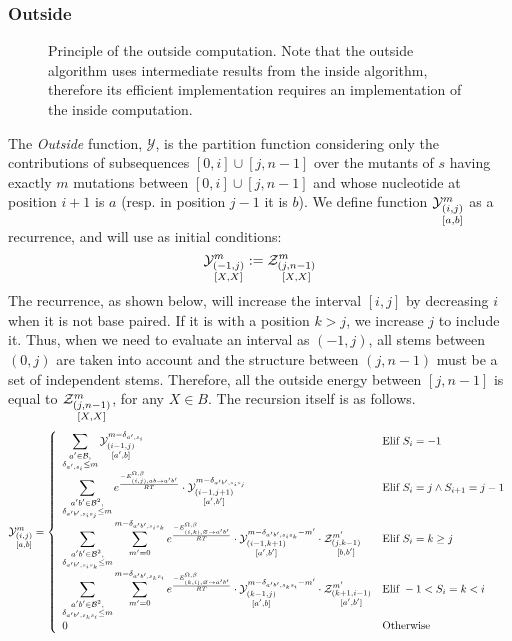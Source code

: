 \subsubsection{Outside}	
\begin{figure}
\resizebox{\textwidth}{!}{}
\caption{Principle of the outside computation. Note that the outside algorithm uses intermediate results from the inside algorithm, 
therefore its efficient implementation requires an implementation of the inside computation.}
\end{figure}
The \emph{Outside} function, $\mathcal Y$, is the partition function considering only the 
contributions of subsequences $[0,i]\cup[j,n-1]$ over the mutants of $s$ having exactly $m$ mutations between $[0,i]\cup[j,n-1]$ and whose nucleotide at position $i+1$ is $a$ 
(resp. in position $j-1$ it is $b$).
We define function $\Y{i,j}{m}{a,b}$ as a recurrence, and will use as initial conditions:
\begin{equation}
	\Y{-1,j}{m}{X,X}:=
		\displaystyle
	  \Z{j,n-1}{m}{X,X}
\label{eq:Y_in}
\end{equation}
The recurrence, as shown below, will increase the interval $[i,j]$ by decreasing $i$ when
it is not base paired. If it is with a position $k>j$, we increase $j$ to include it.
 Thus, when we need
to evaluate an interval as $(-1,j)$, all stems between $(0,j)$ are taken into account and the
structure between $(j,n-1)$ must be a set of independent stems. Therefore,
 all the outside energy between $[j,n-1]$ is
equal to $\Z{j,n-1}{m}{X,X}$, for any $X\in B$. The recursion itself is as follows.
\begin{equation}
	\Y{i,j}{m}{a,b} = \left\{
  \begin{array}{ll}
		\displaystyle
    \sum_{\substack{a'\in \B,\\ \Kron_{a',s_i}\le m}}
    \Y{i-1,j}{m- \Kron_{a',s_i}}{a',b} &
    \text{Elif }S_i=-1 \\
    \displaystyle
    \sum_{\substack{a'b'\in \B^2,\\ \Kron_{a'b',s_is_j}\le m}}
		 e^{\frac{-E_{(i,j),ab \to a'b'}^{\Omega,\beta}}{RT}}\cdot
    \Y{i-1,j+1}{m- \Kron_{a'b',s_is_j}}{a',b'} &
   	 \text{Elif }S_{i}=j \land S_{i+1}=j-1\\
		 \displaystyle
		 \sum_{\substack{a'b'\in \B^2,\\ \Kron_{a'b',s_is_k}\le m}}
		 \sum_{m'=0}^{m-\Kron_{a'b',s_is_k}}
  		 e^{\frac{-E_{(i,k),\varnothing\to a'b'}^{\Omega,\beta}}{RT}}
		 \cdot\Y{i-1,k+1}{m- \Kron_{a'b',s_is_k} - m'}{a',b'}
     \cdot\Z{j,k-1}{m'}{b,b'} &
		 \text{Elif }S_{i}=k \geq j\\
		 \displaystyle
		 \sum_{\substack{a'b'\in \B^2,\\ \Kron_{a'b',s_ks_i}\le m}}
		 \sum_{m'=0}^{m-\Kron_{a'b',s_ks_i}}
   	 e^{\frac{-E_{(k,i),\varnothing\to a'b'}^{\Omega,\beta}}{RT}}
		 \cdot\Y{k-1,j}{m- \Kron_{a'b',s_ks_i} - m'}{a',b}
     \cdot\Z{k+1,i-1}{m'}{a',b'} &
		 \text{Elif }-1 < S_{i}=k < i\\
		 0 & \text{Otherwise}
  \end{array}\right.
\label{eq:Y_rec}
\end{equation}
